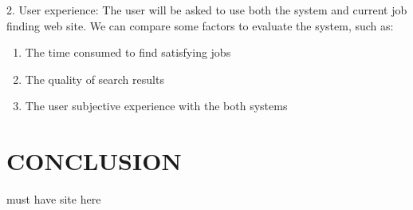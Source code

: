 2.	User experience:  The user will be asked to use both the system and current job finding web site. We can compare some factors to evaluate the system, such as:
 

\begin{enumerate}
    \item The time consumed to find satisfying jobs
    \item The quality of search results
    \item The user subjective experience with the both systems
\end{enumerate}

\section{CONCLUSION}

must have site here ~\cite{Hammond02}
